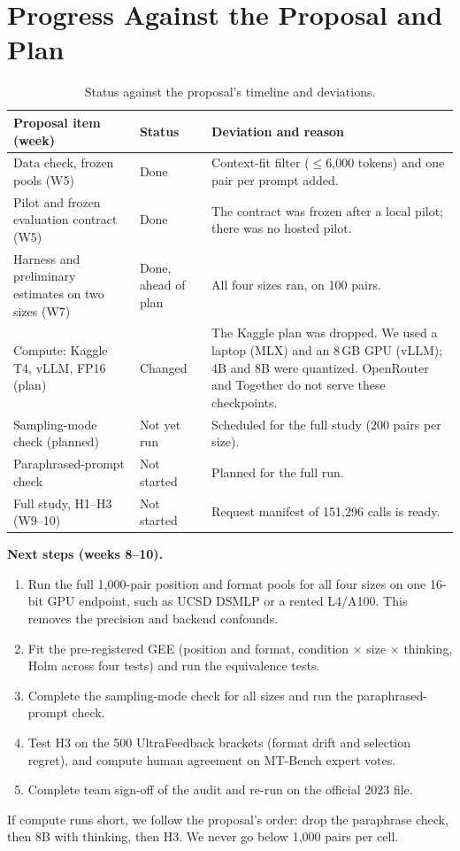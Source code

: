 \documentclass[10pt]{article}
\begin{document}
\section{Progress Against the Proposal and Plan}
\label{sec:plan}
\begin{table}[H]
\centering\small
\caption{Status against the proposal's timeline and deviations.}
\label{tab:plan}
\begin{tabularx}{\linewidth}{>{\raggedright\arraybackslash}p{4.2cm} >{\raggedright\arraybackslash}p{2.1cm} X}
\toprule
Proposal item (week) & Status & Deviation and reason \\
\midrule
Data check, frozen pools (W5) & Done & Context-fit filter ($\leq$6{,}000 tokens) and one pair per prompt added. \\
Pilot and frozen evaluation contract (W5) & Done & The contract was frozen after a local pilot; there was no hosted pilot. \\
Harness and preliminary estimates on two sizes (W7) & Done, ahead of plan & All four sizes ran, on 100 pairs. \\
Compute: Kaggle T4, vLLM, FP16 (plan) & Changed & The Kaggle plan was dropped. We used a laptop (MLX) and an 8\,GB GPU (vLLM); 4B and 8B were quantized. OpenRouter and Together do not serve these checkpoints. \\
Sampling-mode check (planned) & Not yet run & Scheduled for the full study (200 pairs per size). \\
Paraphrased-prompt check & Not started & Planned for the full run. \\
Full study, H1--H3 (W9--10) & Not started & Request manifest of 151{,}296 calls is ready. \\
\bottomrule
\end{tabularx}
\end{table}

\textbf{Next steps (weeks 8--10).}
\begin{enumerate}
\item Run the full 1{,}000-pair position and format pools for all four sizes on one 16-bit GPU endpoint, such as
UCSD DSMLP or a rented L4/A100. This removes the precision and backend confounds.
\item Fit the pre-registered GEE (position and format, condition $\times$ size $\times$ thinking, Holm across four
tests) and run the equivalence tests.
\item Complete the sampling-mode check for all sizes and run the paraphrased-prompt check.
\item Test H3 on the 500 UltraFeedback brackets (format drift and selection regret), and compute human agreement
on MT-Bench expert votes.
\item Complete team sign-off of the audit and re-run on the official 2023 file.
\end{enumerate}
If compute runs short, we follow the proposal's order: drop the paraphrase check, then 8B with thinking, then H3.
We never go below 1{,}000 pairs per cell.
\end{document}
